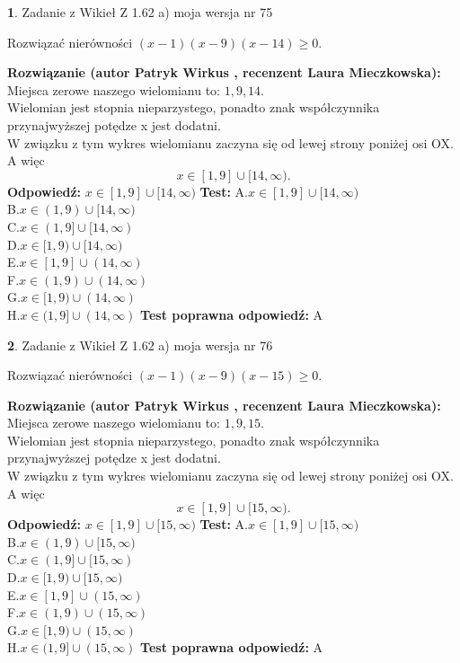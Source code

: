 \documentclass[12pt, a4paper]{article}
\theoremstyle{definition} %
\newtheorem{zad}{}
\newcommand{\zadStart}[1]{\begin{zad}#1\newline}
\newcommand{\zadStop}{\end{zad}}
\newcommand{\rozwStart}[2]{\noindent \textbf{Rozwiązanie (autor #1 , recenzent #2): }\newline}
\newcommand{\rozwStop}{\newline}
\newcommand{\odpStart}{\noindent \textbf{Odpowiedź:}\newline}
\newcommand{\odpStop}{\newline}
\newcommand{\testStart}{\noindent \textbf{Test:}\newline}
\newcommand{\testStop}{\newline}
\newcommand{\kluczStart}{\noindent \textbf{Test poprawna odpowiedź:}\newline}
\newcommand{\kluczStop}{\newline}
\begin{document}
\zadStart{Zadanie z Wikieł Z 1.62 a) moja wersja nr 75}

Rozwiązać nierówności $(x-1)(x-9)(x-14)\ge0$.
\zadStop
\rozwStart{Patryk Wirkus}{Laura Mieczkowska}
Miejsca zerowe naszego wielomianu to: $1, 9, 14$.\\
Wielomian jest stopnia nieparzystego, ponadto znak współczynnika przy\linebreak najwyższej potędze x jest dodatni.\\ W związku z tym wykres wielomianu zaczyna się od lewej strony poniżej osi OX. A więc $$x \in [1,9] \cup [14,\infty).$$
\rozwStop
\odpStart
$x \in [1,9] \cup [14,\infty)$
\odpStop
\testStart
A.$x \in [1,9] \cup [14,\infty)$\\
B.$x \in (1,9) \cup [14,\infty)$\\
C.$x \in (1,9] \cup [14,\infty)$\\
D.$x \in [1,9) \cup [14,\infty)$\\
E.$x \in [1,9] \cup (14,\infty)$\\
F.$x \in (1,9) \cup (14,\infty)$\\
G.$x \in [1,9) \cup (14,\infty)$\\
H.$x \in (1,9] \cup (14,\infty)$
\testStop
\kluczStart
A
\kluczStop



\zadStart{Zadanie z Wikieł Z 1.62 a) moja wersja nr 76}

Rozwiązać nierówności $(x-1)(x-9)(x-15)\ge0$.
\zadStop
\rozwStart{Patryk Wirkus}{Laura Mieczkowska}
Miejsca zerowe naszego wielomianu to: $1, 9, 15$.\\
Wielomian jest stopnia nieparzystego, ponadto znak współczynnika przy\linebreak najwyższej potędze x jest dodatni.\\ W związku z tym wykres wielomianu zaczyna się od lewej strony poniżej osi OX. A więc $$x \in [1,9] \cup [15,\infty).$$
\rozwStop
\odpStart
$x \in [1,9] \cup [15,\infty)$
\odpStop
\testStart
A.$x \in [1,9] \cup [15,\infty)$\\
B.$x \in (1,9) \cup [15,\infty)$\\
C.$x \in (1,9] \cup [15,\infty)$\\
D.$x \in [1,9) \cup [15,\infty)$\\
E.$x \in [1,9] \cup (15,\infty)$\\
F.$x \in (1,9) \cup (15,\infty)$\\
G.$x \in [1,9) \cup (15,\infty)$\\
H.$x \in (1,9] \cup (15,\infty)$
\testStop
\kluczStart
A
\kluczStop
\end{document}
